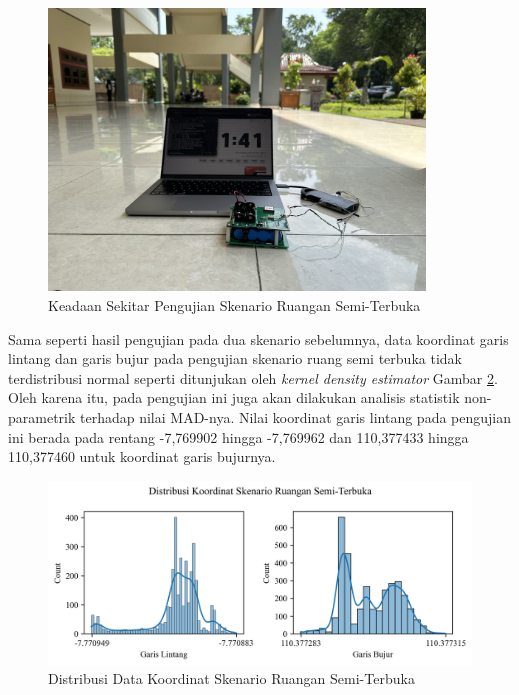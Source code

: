 \begin{figure}[H]
	\centering
	\includegraphics[width=10cm]{contents/chapter-4/3-skenario-semioutdoor/keadaan.jpeg}
	\caption{Keadaan Sekitar Pengujian Skenario Ruangan Semi-Terbuka}
	\label{Fig: semioutdoor-keadaan}
\end{figure}

Sama seperti hasil pengujian pada dua skenario sebelumnya, data koordinat garis lintang dan garis bujur pada pengujian skenario ruang semi terbuka tidak terdistribusi normal seperti ditunjukan oleh \textit{kernel density estimator} Gambar \ref{Fig:semioutdoor-distribution}. Oleh karena itu, pada pengujian ini juga akan dilakukan analisis statistik non-parametrik terhadap nilai MAD-nya. Nilai koordinat garis lintang pada pengujian ini berada pada rentang -7,769902 hingga -7,769962 dan 110,377433 hingga 110,377460 untuk koordinat garis bujurnya.

\begin{figure}[H]
	\centering
	\begin{adjustbox}{width=\textwidth}
		\includegraphics{contents/chapter-4/3-skenario-semioutdoor/distribution.png}
	\end{adjustbox}
	\caption{Distribusi Data Koordinat Skenario Ruangan Semi-Terbuka}
	\label{Fig:semioutdoor-distribution}
\end{figure}

